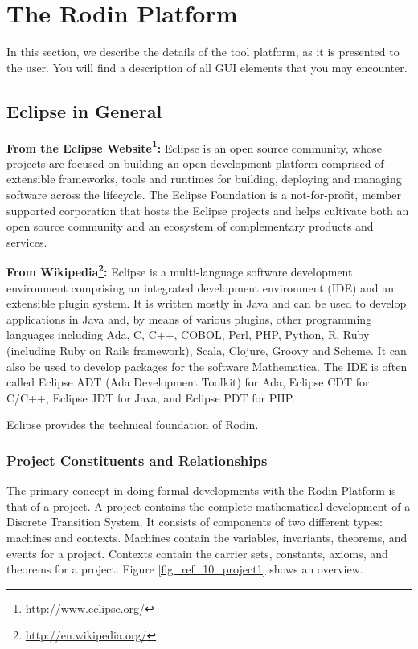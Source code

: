 \section{The Rodin Platform}
\label{rodin_platform}

In this section, we describe the details of the tool platform, as it is presented to the user.  You will find a description of all GUI elements that you may encounter.

\subsection{Eclipse in General}
\label{eclipse}

\textbf{From the Eclipse Website\footnote{\url{http://www.eclipse.org/}}:}
Eclipse is an open source community, whose projects are focused on building an open development platform comprised of extensible frameworks, tools and runtimes for building, deploying and managing software across the lifecycle. The Eclipse Foundation is a not-for-profit, member supported corporation that hosts the Eclipse projects and helps cultivate both an open source community and an ecosystem of complementary products and services.

\textbf{From Wikipedia\footnote{\url{http://en.wikipedia.org/}}:}
Eclipse is a multi-language software development environment comprising an integrated development environment (IDE) and an extensible plugin system. It is written mostly in Java and can be used to develop applications in Java and, by means of various plugins, other programming languages including Ada, C, C++, COBOL, Perl, PHP, Python, R, Ruby (including Ruby on Rails framework), Scala, Clojure, Groovy and Scheme. It can also be used to develop packages for the software Mathematica. The IDE is often called Eclipse ADT (Ada Development Toolkit) for Ada, Eclipse CDT for C/C++, Eclipse JDT for Java, and Eclipse PDT for PHP.

Eclipse provides the technical foundation of Rodin.

\subsubsection{Project Constituents and Relationships}
\label{project}

The primary concept in doing formal developments with the Rodin Platform is that of a project. A project contains the complete mathematical development of a Discrete Transition System. It consists of components of two different types: machines and contexts. Machines contain the variables, invariants, theorems, and events for a project. Contexts contain the carrier sets, constants, axioms, and theorems for a project. Figure \ref{fig_ref_10_project1} shows an overview.

